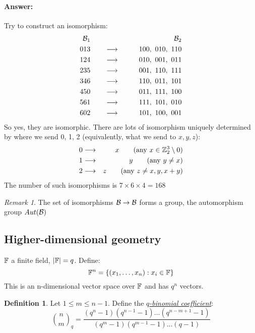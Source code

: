 \documentclass[]{article}
\theoremstyle{definition}
\newtheorem*{defn}{Definition}
\theoremstyle{remark}
\newtheorem*{rem}{Remark}
\numberwithin{equation}{section}
\begin{document}
				\paragraph*{Answer:} Try to construct an isomorphism:
				\begin{align*}
						\mathcal B_1 & \qquad &\mathcal B_2 \\
						0 1 3 & \qquad\longrightarrow\qquad   & 100,\ 010,\ 110\\
						1 2 4 & \qquad\longrightarrow\qquad   & 010,\ 001,\ 011\\
						2 3 5 & \qquad\longrightarrow\qquad   & 001,\ 110,\ 111\\
						3 4 6 & \qquad\longrightarrow\qquad   & 110,\ 011,\ 101\\
						4 5 0 & \qquad\longrightarrow\qquad   & 011,\ 111,\ 100\\
						5 6 1 & \qquad\longrightarrow\qquad   & 111,\ 101,\ 010\\
						6 0 2 & \qquad\longrightarrow\qquad   & 101,\ 100,\ 001\\
				\end{align*}
				So yes, they are isomorphic. There are lots of isomorphism uniquely determined by where we send 0, 1, 2 (equivalently, what we send to $x, y, z$):
				\begin{align*}
					0 & \longrightarrow & x \qquad (\text{any}\ x \in \ZZ_2^3\setminus 0)\\
					1 & \longrightarrow & y \qquad (\text{any}\ y \neq x)\\
					2 & \longrightarrow & z \qquad (\text{any}\ z\neq x,y, x+y)\\
				\end{align*}
				The number of such isomorphisms is $7 \times 6 \times 4 = 168$

				\begin{rem}
					The set of isomorphisms $\mathcal B \to \mathcal B$ forms a group, the automorphism group $Aut(\mathcal B)$
				\end{rem}
		\subsection*{Higher-dimensional geometry}
			$\mathbb F$ a finite field, $|\mathbb F| = q$. Define:
			\[
				\mathbb F^n = \{(x_1, \hdots, x_n): x_i \in \mathbb F\}
			\]
			This is an n-dimensional vector space over $\mathbb F$ and has $q^n$ vectors.

			\begin{defn}
				Let $1 \leq m \leq n-1$. Define the \emph{\underline{$q$-binomial coefficient}}:
				\[
					\binom{n}{m}_q = \frac{(q^n-1)(q^{n-1} - 1)\hdots (q^{n-m + 1} -1)}{(q^m-1)(q^{m-1} - 1)\hdots (q -1)}
				\]
			\end{defn}
\end{document}
